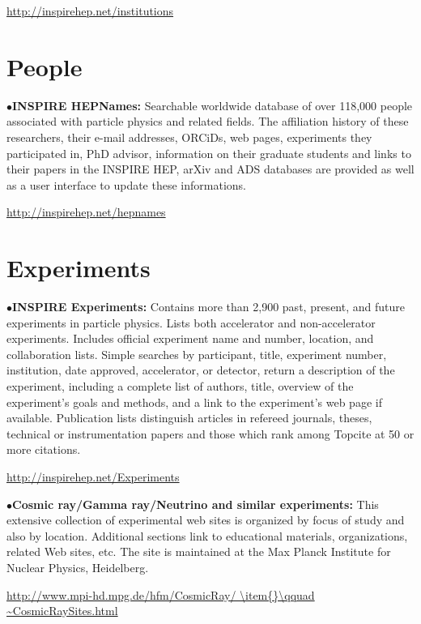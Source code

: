	\item{}\qquad\url{http://inspirehep.net/institutions}


\section{People} %


\item{$\bullet$}{\bf INSPIRE HEPNames:} 
Searchable worldwide database of over 118,000 people associated with particle physics and related fields. The affiliation history of these researchers, their e-mail addresses, ORCiDs, web pages, experiments they participated in, PhD advisor, information on their graduate students and links to their papers in the INSPIRE HEP, arXiv and ADS databases are provided as well as a user interface to update these informations.

	\item{}\qquad\url{http://inspirehep.net/hepnames}



\section{Experiments}  %

\item{$\bullet$}{\bf INSPIRE Experiments:} 
Contains more than 2,900 past, present, and future experiments in particle physics. Lists both accelerator and non-accelerator experiments. Includes official experiment name and number, location, and collaboration lists. Simple searches by participant, title, experiment number, institution, date approved, accelerator, or detector, return a description of the experiment, including a complete list of authors, title, overview of the experiment's goals and methods, and a link to the experiment's web page if available. Publication lists distinguish articles in refereed journals, theses, technical or instrumentation papers and those which rank among Topcite at 50 or more citations.
 
	\item{}\qquad\url{http://inspirehep.net/Experiments}

\medskip

\item{$\bullet$}{\bf Cosmic ray/Gamma ray/Neutrino and similar experiments:} 
This extensive collection of experimental web sites is organized by focus of study and also by location. Additional sections link to educational materials, organizations, related Web sites, etc. The site is maintained at the Max Planck Institute for Nuclear Physics, Heidelberg.
	\item{}\qquad\url{http://www.mpi-hd.mpg.de/hfm/CosmicRay/
\item{}\qquad ~CosmicRaySites.html}

